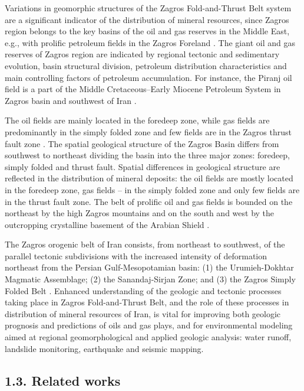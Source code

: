 \documentclass[12pt,a4paper,oneside]{article}
\def \newpar{\vspace{6pt}}
\begin{document}
\newpar Variations in geomorphic structures of the Zagros Fold-and-Thrust Belt system are a significant indicator of the distribution of mineral resources, since Zagros region belongs to the key basins of the oil and gas reserves in the Middle East, e.g., with prolific petroleum fields in the Zagros Foreland \citep{Bosold}. The giant oil and gas reserves of Zagros region are indicated by regional tectonic and sedimentary evolution, basin structural division, petroleum distribution characteristics and main controlling factors of petroleum accumulation. For instance, the Piranj oil field is a part of the Middle Cretaceous--Early Miocene Petroleum System in Zagros basin and southwest of Iran \citep{ELYASI2016448}. 

\newpar The oil fields are mainly located in the foredeep zone, while gas fields are predominantly in the simply folded zone and few fields are in the Zagros thrust fault zone \citep{LIU2018273}. The spatial geological structure of the Zagros Basin differs from southwest to northeast dividing the basin into the three major zones: foredeep, simply folded and thrust fault. Spatial differences in geological structure are reflected in the distribution of mineral deposits: the oil fields are mostly located in the foredeep zone, gas fields -- in the simply folded zone and only few fields are in the thrust fault zone. The belt of prolific oil and gas fields is bounded on the northeast by the high Zagros mountains and on the south and west by the outcropping crystalline basement of the Arabian Shield \citep{Beydoun}. 

\newpar The Zagros orogenic belt of Iran consists, from northeast to southwest, of the parallel tectonic subdivisions with the increased intensity of deformation northeast from the Persian Gulf-Mesopotamian basin: (1) the Urumieh-Dokhtar Magmatic Assemblage; (2) the Sanandaj-Sirjan Zone; and (3) the Zagros Simply Folded Belt \citep{Alavi1994}. Enhanced understanding of the geologic and tectonic processes taking place in Zagros Fold-and-Thrust Belt, and the role of these processes in distribution of mineral resources of Iran, is vital for improving both geologic prognosis and predictions of oils and gas plays, and for environmental modeling aimed at regional geomorphological and applied geologic analysis: water runoff, landslide monitoring, earthquake and seismic mapping.

\subsection*{1.3. Related works}
\end{document}
